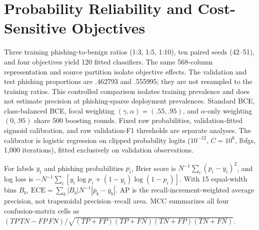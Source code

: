 \documentclass[10pt]{article}
\newenvironment{bluechange}{\color{black}}{}
\begin{document}
\section{Probability Reliability and Cost-Sensitive Objectives}
\begin{bluechange}
Three training phishing-to-benign ratios (1:3, 1:5, 1:10), ten paired seeds (42--51), and four objectives yield 120 fitted classifiers. The same 568-column representation and source partition isolate objective effects. The validation and test phishing proportions are .462793 and .555995; they are not resampled to the training ratios. This controlled comparison isolates training prevalence and does not estimate precision at phishing-sparse deployment prevalences. Standard BCE, class-balanced BCE, focal weighting $(\gamma,\alpha)=(.55,.95)$, and $\alpha$-only weighting $(0,.95)$ share 500 boosting rounds. Fixed raw probabilities, validation-fitted sigmoid calibration, and raw validation-F1 thresholds are separate analyses. The calibrator is logistic regression on clipped probability logits ($10^{-12}$, $C=10^6$, lbfgs, 1,000 iterations), fitted exclusively on validation observations.

For labels $y_i$ and phishing probabilities $p_i$, Brier score is $N^{-1}\sum_i(p_i-y_i)^2$, and log loss is $-N^{-1}\sum_i[y_i\log p_i+(1-y_i)\log(1-p_i)]$. With 15 equal-width bins $B_b$, $\mathrm{ECE}=\sum_b|B_b|N^{-1}|\overline p_b-\overline y_b|$. AP is the recall-increment-weighted average precision, not trapezoidal precision--recall area. MCC summarizes all four confusion-matrix cells as $(TP\,TN-FP\,FN)/\sqrt{(TP+FP)(TP+FN)(TN+FP)(TN+FN)}$.
\end{bluechange}
\end{document}

